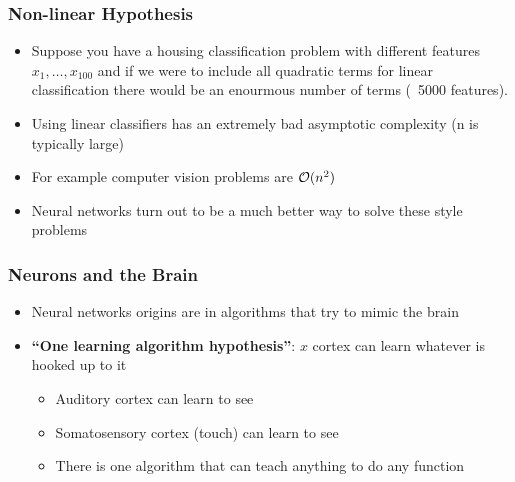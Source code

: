 \subsubsection{Non-linear Hypothesis}
\begin{itemize}[--]
	\item Suppose you have a housing classification problem with different features $x_1, \ldots ,x_100$ and if we were to include all quadratic terms for linear classification there would be an enourmous number of terms (~5000 features).
	\item Using linear classifiers has an extremely bad asymptotic complexity (n is typically large)
	\item For example computer vision problems are $\mathcal{O}(n^2)$
	\item Neural networks turn out to be a much better way to solve these style problems
\end{itemize}

\subsubsection{Neurons and the Brain}
\begin{itemize}[--]
	\item Neural networks origins are in algorithms that try to mimic the brain
	\item \textbf{``One learning algorithm hypothesis''}: $x$ cortex can learn whatever is hooked up to it
	\begin{itemize}[--]
		\item Auditory cortex can learn to see
		\item Somatosensory cortex (touch) can learn to see
		\item There is one algorithm that can teach anything to do any function
	\end{itemize}
\end{itemize}

